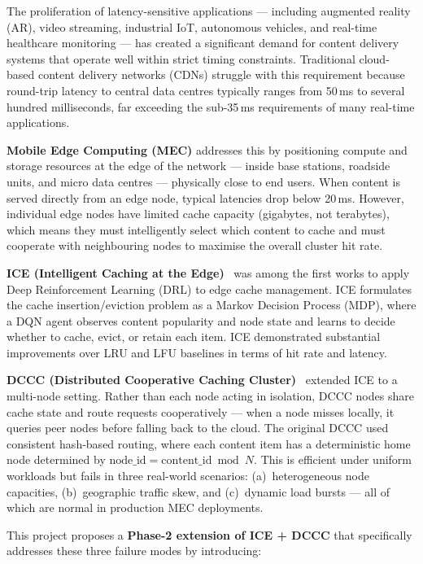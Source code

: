\documentclass[12pt,a4paper]{report}
\begin{document}
The proliferation of latency-sensitive applications --- including augmented reality (AR), video
streaming, industrial IoT, autonomous vehicles, and real-time healthcare monitoring --- has
created a significant demand for content delivery systems that operate well within strict timing
constraints. Traditional cloud-based content delivery networks (CDNs) struggle with this
requirement because round-trip latency to central data centres typically ranges from 50\,ms
to several hundred milliseconds, far exceeding the sub-35\,ms requirements of many
real-time applications.

\textbf{Mobile Edge Computing (MEC)} addresses this by positioning compute and storage
resources at the edge of the network --- inside base stations, roadside units, and micro data
centres --- physically close to end users. When content is served directly from an edge node,
typical latencies drop below 20\,ms. However, individual edge nodes have limited cache
capacity (gigabytes, not terabytes), which means they must intelligently select which content
to cache and must cooperate with neighbouring nodes to maximise the overall cluster hit rate.

\textbf{ICE (Intelligent Caching at the Edge)}~\cite{ref1} was among the first works to apply
Deep Reinforcement Learning (DRL) to edge cache management. ICE formulates the cache
insertion/eviction problem as a Markov Decision Process (MDP), where a DQN agent observes
content popularity and node state and learns to decide whether to cache, evict, or retain each
item. ICE demonstrated substantial improvements over LRU and LFU baselines in terms of
hit rate and latency.

\textbf{DCCC (Distributed Cooperative Caching Cluster)}~\cite{ref2} extended ICE to a
multi-node setting. Rather than each node acting in isolation, DCCC nodes share cache state
and route requests cooperatively --- when a node misses locally, it queries peer nodes before
falling back to the cloud. The original DCCC used consistent hash-based routing, where each
content item has a deterministic home node determined by $\text{node\_id} = \text{content\_id}
\bmod N$. This is efficient under uniform workloads but fails in three real-world scenarios:
(a)~heterogeneous node capacities, (b)~geographic traffic skew, and (c)~dynamic load bursts
--- all of which are normal in production MEC deployments.

This project proposes a \textbf{Phase-2 extension of ICE + DCCC} that specifically addresses
these three failure modes by introducing:
\end{document}
